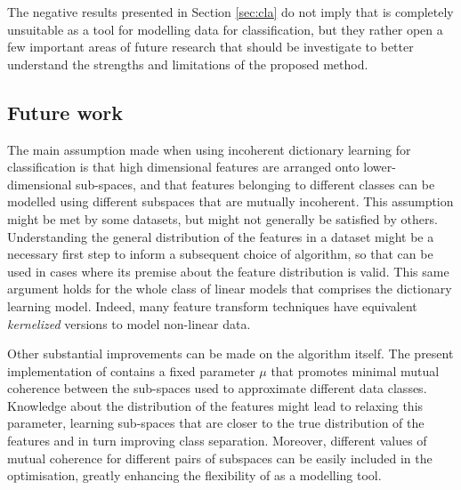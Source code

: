 \documentclass{article}
\def \coherence{\mu} 		%
\begin{document}
The negative results presented in Section \ref{sec:cla} do not imply that  is completely unsuitable as a tool for modelling data for classification, but they rather open a few important areas of future research that should be investigate to better understand the strengths and limitations of the proposed method.

\subsection{Future work}
The main assumption made when using incoherent dictionary learning for classification is that high dimensional features are arranged onto lower-dimensional sub-spaces, and that features belonging to different classes can be modelled using different subspaces that are mutually incoherent. This assumption might be met by some datasets, but might not generally be satisfied by others. Understanding the general distribution of the features in a  dataset might be a necessary first step to inform a subsequent choice of algorithm, so that  can be used in cases where its premise about the feature distribution is valid. This same argument holds for the whole class of linear models that comprises the dictionary learning model. Indeed, many feature transform techniques have equivalent \emph{kernelized} versions to model non-linear data.

Other substantial improvements can be made on the algorithm itself. The present implementation of  contains a fixed parameter $\coherence$ that promotes minimal mutual coherence between the sub-spaces used to approximate different data classes. Knowledge about the distribution of the features might lead to relaxing this parameter, learning sub-spaces that are closer to the true distribution of the features and in turn improving class separation. Moreover, different values of mutual coherence for different pairs of subspaces can be easily included in the optimisation, greatly enhancing the flexibility of  as a modelling tool.



\end{document}
